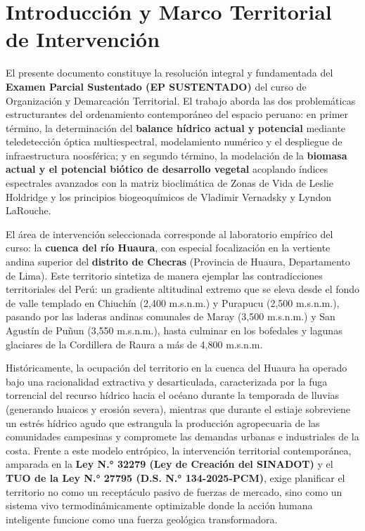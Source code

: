 \documentclass[11pt,a4paper]{article}
\begin{document}
\newpage
\tableofcontents
\newpage

\section{Introducción y Marco Territorial de Intervención}

El presente documento constituye la resolución integral y fundamentada del \textbf{Examen Parcial Sustentado (EP SUSTENTADO)} del curso de Organización y Demarcación Territorial. El trabajo aborda las dos problemáticas estructurantes del ordenamiento contemporáneo del espacio peruano: en primer término, la determinación del \textbf{balance hídrico actual y potencial} mediante teledetección óptica multiespectral, modelamiento numérico y el despliegue de infraestructura noosférica; y en segundo término, la modelación de la \textbf{biomasa actual y el potencial biótico de desarrollo vegetal} acoplando índices espectrales avanzados con la matriz bioclimática de Zonas de Vida de Leslie Holdridge y los principios biogeoquímicos de Vladimir Vernadsky y Lyndon LaRouche.

El área de intervención seleccionada corresponde al laboratorio empírico del curso: la \textbf{cuenca del río Huaura}, con especial focalización en la vertiente andina superior del \textbf{distrito de Checras} (Provincia de Huaura, Departamento de Lima). Este territorio sintetiza de manera ejemplar las contradicciones territoriales del Perú: un gradiente altitudinal extremo que se eleva desde el fondo de valle templado en Chiuchín (2,400 m.s.n.m.) y Purapucu (2,500 m.s.n.m.), pasando por las laderas andinas comunales de Maray (3,500 m.s.n.m.) y San Agustín de Puñun (3,550 m.s.n.m.), hasta culminar en los bofedales y lagunas glaciares de la Cordillera de Raura a más de 4,800 m.s.n.m.

Históricamente, la ocupación del territorio en la cuenca del Huaura ha operado bajo una racionalidad extractiva y desarticulada, caracterizada por la fuga torrencial del recurso hídrico hacia el océano durante la temporada de lluvias (generando huaicos y erosión severa), mientras que durante el estiaje sobreviene un estrés hídrico agudo que estrangula la producción agropecuaria de las comunidades campesinas y compromete las demandas urbanas e industriales de la costa. Frente a este modelo entrópico, la intervención territorial contemporánea, amparada en la \textbf{Ley N.° 32279 (Ley de Creación del SINADOT)} y el \textbf{TUO de la Ley N.° 27795 (D.S. N.° 134-2025-PCM)}, exige planificar el territorio no como un receptáculo pasivo de fuerzas de mercado, sino como un sistema vivo termodinámicamente optimizable donde la acción humana inteligente funcione como una fuerza geológica transformadora.
\end{document}
